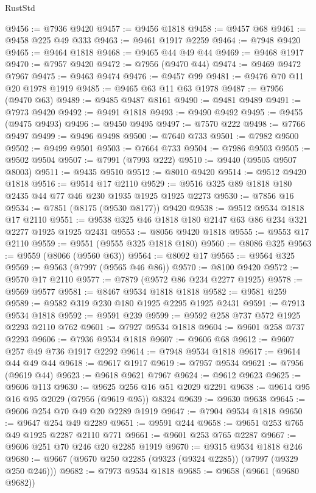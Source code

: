 \begin{lexlean}{RustStd}
\begin{coremodule}
@9456 := @7936 @9420
@9457 := @9456 @1818
@9458 := @9457 @68
@9461 := @9458 @225 @49 @333
@9463 := @9461 @1917 @2259
@9464 := @7948 @9420
@9465 := @9464 @1818
@9468 := @9465 @44 @49 @44
@9469 := @9468 @1917
@9470 := @7957 @9420
@9472 := @7956 (@9470 @44)
@9474 := @9469 @9472 @7967
@9475 := @9463 @9474
@9476 := @9457 @99
@9481 := @9476 @70 @11 @20 @1978 @1919
@9485 := @9465 @63 @11 @63 @1978
@9487 := @7956 (@9470 @63)
@9489 := @9485 @9487 @8161
@9490 := @9481 @9489
@9491 := @7973 @9420
@9492 := @9491 @1818
@9493 := @9490 @9492
@9495 := @9455 (@9475 @9493)
@9496 := @9450 @9495
@9497 := @7570 @222
@9498 := @7766 @9497
@9499 := @9496 @9498
@9500 := @7640 @733
@9501 := @7982 @9500
@9502 := @9499 @9501
@9503 := @7664 @733
@9504 := @7986 @9503
@9505 := @9502 @9504
@9507 := @7991 (@7993 @222)
@9510 := @9440 (@9505 @9507 @8003)
@9511 := @9435 @9510
@9512 := @8010 @9420
@9514 := @9512 @9420 @1818
@9516 := @9514 @17 @2110
@9529 := @9516 @325 @89 @1818 @180 @2435 @44 @77 @46 @230 @1935 @1925 @1925 @2273
@9530 := @7856 @16
@9534 := @7851 (@8175 (@9530 @8177)) @9420
@9538 := @9512 @9534 @1818 @17 @2110
@9551 := @9538 @325 @46 @1818 @180 @2147 @63 @86 @234 @321 @2277 @1925 @1925 @2431
@9553 := @8056 @9420 @1818
@9555 := @9553 @17 @2110
@9559 := @9551 (@9555 @325 @1818 @180)
@9560 := @8086 @325
@9563 := @9559 (@8066 (@9560 @63))
@9564 := @8092 @17
@9565 := @9564 @325
@9569 := @9563 (@7997 (@9565 @46 @86))
@9570 := @8100 @9420
@9572 := @9570 @17 @2110
@9577 := @7879 (@9572 @86 @234 @2277 @1925)
@9578 := @9569 @9577
@9581 := @8467 @9534 @1818 @1818
@9582 := @9581 @259
@9589 := @9582 @319 @230 @180 @1925 @2295 @1925 @2431
@9591 := @7913 @9534 @1818
@9592 := @9591 @239
@9599 := @9592 @258 @737 @572 @1925 @2293 @2110 @762
@9601 := @7927 @9534 @1818
@9604 := @9601 @258 @737 @2293
@9606 := @7936 @9534 @1818
@9607 := @9606 @68
@9612 := @9607 @257 @49 @736 @1917 @2292
@9614 := @7948 @9534 @1818
@9617 := @9614 @44 @49 @44
@9618 := @9617 @1917
@9619 := @7957 @9534
@9621 := @7956 (@9619 @44)
@9623 := @9618 @9621 @7967
@9624 := @9612 @9623
@9625 := @9606 @113
@9630 := @9625 @256 @16 @51 @2029 @2291
@9638 := @9614 @95 @16 @95 @2029 (@7956 (@9619 @95)) @8324
@9639 := @9630 @9638
@9645 := @9606 @254 @70 @49 @20 @2289 @1919
@9647 := @7904 @9534 @1818
@9650 := @9647 @254 @49 @2289
@9651 := @9591 @244
@9658 := @9651 @253 @765 @49 @1925 @2287 @2110 @771
@9661 := @9601 @253 @765 @2287
@9667 := @9606 @251 @70 @246 @20 @2285 @1919
@9670 := @9315 @9534 @1818 @246
@9680 := @9667 (@9670 @250 @2285 (@9323 (@9324 @2285)) (@7997 (@9329 @250 @246)))
@9682 := @7973 @9534 @1818
@9685 := @9658 (@9661 (@9680 @9682))

\end{coremodule}
\end{lexlean}
